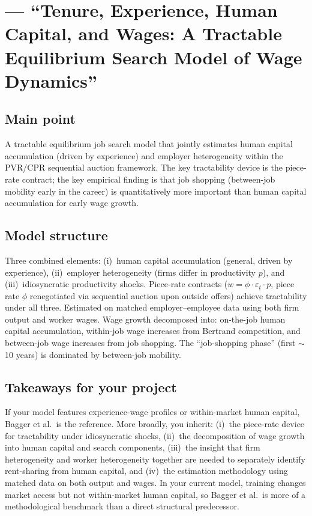 \documentclass[12pt]{article}
\begin{document}
\section{\citet{bagger2014} --- ``Tenure, Experience, Human Capital, and Wages: A Tractable Equilibrium Search Model of Wage Dynamics''}

\subsection*{Main point}

A tractable equilibrium job search model that jointly estimates human capital accumulation (driven by experience) and employer heterogeneity within the PVR/CPR sequential auction framework. The key tractability device is the piece-rate contract; the key empirical finding is that job shopping (between-job mobility early in the career) is quantitatively more important than human capital accumulation for early wage growth.

\subsection*{Model structure}

Three combined elements: (i)~human capital accumulation (general, driven by experience), (ii)~employer heterogeneity (firms differ in productivity $p$), and (iii)~idiosyncratic productivity shocks. Piece-rate contracts ($w = \phi \cdot \varepsilon_t \cdot p$, piece rate $\phi$ renegotiated via sequential auction upon outside offers) achieve tractability under all three. Estimated on matched employer--employee data using both firm output and worker wages. Wage growth decomposed into: on-the-job human capital accumulation, within-job wage increases from Bertrand competition, and between-job wage increases from job shopping. The ``job-shopping phase'' (first $\sim$10 years) is dominated by between-job mobility.

\subsection*{Takeaways for your project}

If your model features experience-wage profiles or within-market human capital, Bagger et al.\ is the reference. More broadly, you inherit: (i)~the piece-rate device for tractability under idiosyncratic shocks, (ii)~the decomposition of wage growth into human capital and search components, (iii)~the insight that firm heterogeneity and worker heterogeneity together are needed to separately identify rent-sharing from human capital, and (iv)~the estimation methodology using matched data on both output and wages. In your current model, training changes market access but not within-market human capital, so Bagger et al.\ is more of a methodological benchmark than a direct structural predecessor.
\end{document}
